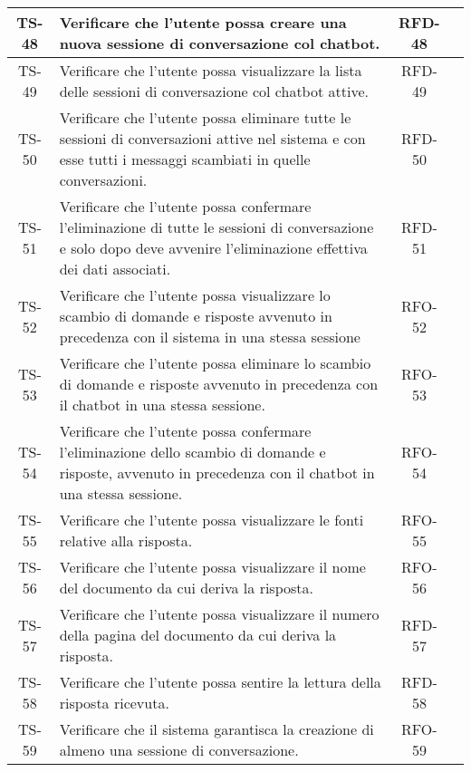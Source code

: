 \begin{xltabular}{\textwidth}{| c | X | c | c |}
    \hline
    TS-48 & Verificare che l'utente possa creare una nuova sessione di conversazione col chatbot. & RFD-48 & \textcolor{cmarkcolor}{} \\
    \hline
    TS-49 & Verificare che l'utente possa visualizzare la lista delle sessioni di conversazione col chatbot attive. & RFD-49 & \textcolor{cmarkcolor}{} \\
    \hline
    TS-50 & Verificare che l'utente possa eliminare tutte le sessioni di conversazioni attive nel sistema e con esse tutti i messaggi scambiati in quelle conversazioni. & RFD-50 & \textcolor{cmarkcolor}{} \\
    \hline
    TS-51 & Verificare che l'utente possa confermare l’eliminazione di tutte le sessioni di conversazione e solo dopo deve avvenire l'eliminazione effettiva dei dati associati. & RFD-51 & \textcolor{cmarkcolor}{} \\
    \hline
    TS-52 & Verificare che l'utente possa visualizzare lo scambio di domande e risposte avvenuto in precedenza con il sistema in una stessa sessione & RFO-52 & \textcolor{cmarkcolor}{} \\
    \hline
    TS-53 & Verificare che l'utente possa eliminare lo scambio di domande e risposte avvenuto in precedenza con il chatbot in una stessa sessione. & RFO-53 & \textcolor{cmarkcolor}{} \\
    \hline
    TS-54 & Verificare che l'utente possa confermare l'eliminazione dello scambio di domande e risposte, avvenuto in precedenza con il chatbot in una stessa sessione. & RFO-54 & \textcolor{cmarkcolor}{} \\
    \hline
    TS-55 & Verificare che l'utente possa visualizzare le fonti relative alla risposta. & RFO-55 & \textcolor{cmarkcolor}{} \\
    \hline
    TS-56 & Verificare che l'utente possa visualizzare il nome del documento da cui deriva la risposta. & RFO-56 & \textcolor{cmarkcolor}{} \\
    \hline
    TS-57 & Verificare che l'utente possa visualizzare il numero della pagina del documento da cui deriva la risposta. & RFD-57 & \textcolor{cmarkcolor}{} \\
    \hline
    TS-58 & Verificare che l'utente possa sentire la lettura della risposta ricevuta. & RFD-58 & \textcolor{xmarkcolor}{} \\
    \hline
    TS-59 & Verificare che il sistema garantisca la creazione di almeno una sessione di conversazione. & RFO-59 & \textcolor{cmarkcolor}{} \\

\end{xltabular}
